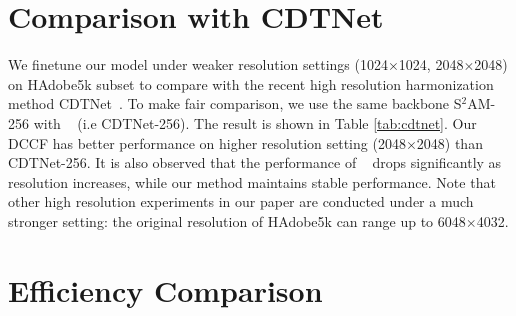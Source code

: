 \documentclass[runningheads]{llncs}
\begin{document}
\section{Comparison with CDTNet}

We finetune our model under weaker resolution settings (1024$\times$1024, 2048$\times$2048) on HAdobe5k subset to compare with the recent high resolution harmonization method CDTNet~\cite{CDTNet}. To make fair comparison, we use the same backbone S$^2$AM-256 with ~\cite{CDTNet} (i.e CDTNet-256). The result is shown in Table \ref{tab:cdtnet}. Our DCCF has better performance on higher resolution setting (2048$\times$2048) than CDTNet-256. It is also observed that the performance of ~\cite{CDTNet} drops significantly as resolution increases, while our method maintains stable performance. Note that other high resolution experiments in our paper are conducted under a much stronger setting: the original resolution of HAdobe5k can range up to 6048$\times$4032.

   \begin{table}[!htb]
        \scriptsize
            \centering
            \vspace{-5pt}
              \vspace{7pt}
              \caption{\textbf{Quantative comparison} with CDTNet~\cite{CDTNet} on HAdobe5k subset.}
              \label{tab:cdtnet}
        
    \end{table}

\section{Efficiency Comparison}
\label{sec:high-res-efficiency}
\end{document}

